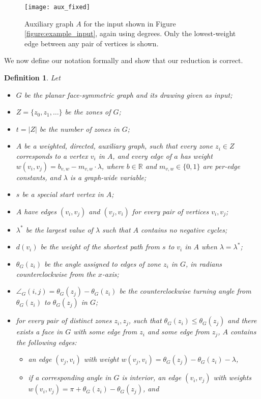 \documentclass[11pt,letter]{article}
\newtheorem{definition}[theorem]{Definition}
\begin{document}
\begin{figure}[t]
\centering
\texttt{[image: aux\_fixed]}
\caption{Auxiliary graph $A$ for the input shown in Figure \ref{figure:example_input}, again using degrees.  Only the lowest-weight edge between any pair of vertices is shown.}
\label{figure:example_aux}
\end{figure}

We now define our notation formally and show that our reduction is correct.

\begin{definition}
Let
\begin{itemize}
\item $G$ be the planar face-symmetric graph and its drawing given as input;
\item $Z=\{z_0,z_1,\ldots\}$ be the zones of $G$;
\item $t=|Z|$ be the number of zones in $G$;
\item $A$ be a weighted, directed, auxiliary graph, such that every zone $z_i \in Z$ corresponds to a vertex $v_i$ in $A$, and every edge of $a$ has weight $w(v_i,v_j) = b_{v,w} - m_{v,w} \cdot \lambda$, where $b \in \mathbb{R}$ and $m_{v,w} \in \{0,1\}$ are per-edge constants, and $\lambda$ is a graph-wide variable;
\item $s$ be a special start vertex in $A$;
\item $A$ have edges $(v_i,v_j)$ and $(v_j,v_i)$ for every pair of vertices $v_i,v_j$;
\item $\lambda^*$ be the largest value of $\lambda$ such that $A$ contains no negative cycles;
\item $d(v_i)$ be the weight of the shortest path from $s$ to $v_i$ in $A$ when $\lambda=\lambda^*$;
\item $\theta_G(z_i)$ be the angle assigned to edges of zone $z_i$ in $G$, in radians counterclockwise from the $x$-axis;
\item $\angle_{G}(i,j) = \theta_G(z_j)-\theta_G(z_i)$ be the counterclockwise turning angle from $\theta_G(z_i)$ to $\theta_G(z_j)$ in $G$;
\item for every pair of distinct zones $z_i, z_j$, such that $\theta_G(z_i) \leq \theta_G(z_j)$ and there exists a face in $G$ with some edge from $z_i$ and some edge from $z_j$, $A$ contains the following edges:
   \begin{itemize}
   \item an edge $(v_j,v_i)$ with weight $w(v_j,v_i)=\theta_G(z_j)-\theta_G(z_i)-\lambda$,
   \item if a corresponding angle in $G$ is interior, an edge $(v_i,v_j)$ with weights $w(v_i,v_j)=\pi+\theta_G(z_i)-\theta_G(z_j)$, and

\end{itemize}
\end{itemize}
\end{definition}
\end{document}
